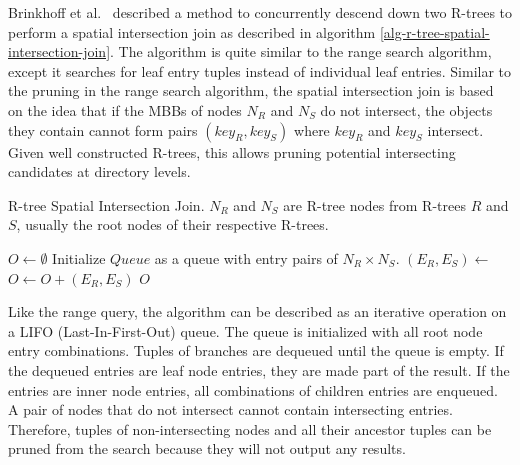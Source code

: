 Brinkhoff et al.~\cite{brinkhoff1993efficient} described a method to concurrently descend down two R-trees to perform a spatial intersection join as described in algorithm \ref{alg-r-tree-spatial-intersection-join}. The algorithm is quite similar to the range search algorithm, except it searches for leaf entry tuples instead of individual leaf entries. Similar to the pruning in the range search algorithm, the spatial intersection join is based on the idea that if the MBBs of nodes \(N_R\) and \(N_S\) do not intersect, the objects they contain cannot form pairs \((key_R, key_S)\) where \(key_R\) and \(key_S\) intersect. Given well constructed R-trees, this allows pruning potential intersecting candidates at directory levels.

\begin{algorithm}
  \caption{R-tree Spatial Intersection Join. \(N_R\) and \(N_S\) are R-tree nodes from R-trees \(R\) and \(S\), usually the root nodes of their respective R-trees.}
  \label{alg-r-tree-spatial-intersection-join}
  \begin{algorithmic}[1]
      \State \(O \leftarrow \emptyset\)
      \State Initialize \(Queue\) as a queue with entry pairs of \(N_R \times N_S\).
        \State \((E_R, E_S) \leftarrow\) 
            \State \(O \leftarrow O + (E_R, E_S)\)
          \Else
                \State {}
              \EndFor
            \EndFor
          \EndIf
        \EndIf
      \EndWhile
      \State \Return \(O\)
    \EndFunction
  \end{algorithmic}
\end{algorithm}

Like the range query, the algorithm can be described as an iterative operation on a LIFO (Last-In-First-Out) queue. The queue is initialized with all root node entry combinations. Tuples of branches are dequeued until the queue is empty. If the dequeued entries are leaf node entries, they are made part of the result. If the entries are inner node entries, all combinations of children entries are enqueued. A pair of nodes that do not intersect cannot contain intersecting entries. Therefore, tuples of non-intersecting nodes and all their ancestor tuples can be pruned from the search because they will not output any results.

